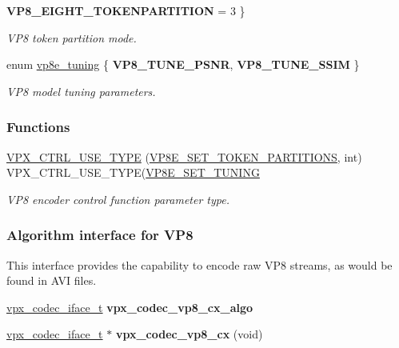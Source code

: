 \begin{DoxyCompactItemize}
{\bfseries V\-P8\-\_\-\-E\-I\-G\-H\-T\-\_\-\-T\-O\-K\-E\-N\-P\-A\-R\-T\-I\-T\-I\-O\-N} = 3
 \}
\begin{DoxyCompactList}\small\item\em V\-P8 token partition mode. \end{DoxyCompactList}\item 
enum \hyperlink{group__vp8__encoder_ga371dbc29054b3d46364af996ad42ab94}{vp8e\-\_\-tuning} \{ {\bfseries V\-P8\-\_\-\-T\-U\-N\-E\-\_\-\-P\-S\-N\-R}, 
{\bfseries V\-P8\-\_\-\-T\-U\-N\-E\-\_\-\-S\-S\-I\-M}
 \}
\begin{DoxyCompactList}\small\item\em V\-P8 model tuning parameters. \end{DoxyCompactList}\end{DoxyCompactItemize}
\subsubsection*{Functions}
\begin{DoxyCompactItemize}
\item 
\hyperlink{group__vp8__encoder_gafdd19c923e5a9457928d924823d1c5f4}{V\-P\-X\-\_\-\-C\-T\-R\-L\-\_\-\-U\-S\-E\-\_\-\-T\-Y\-P\-E} (\hyperlink{group__vp8__encoder_gga6deae3d561c838952552c3d3756322eca462a4f14f39a6eb5c4a4004fc8d0ad75}{V\-P8\-E\-\_\-\-S\-E\-T\-\_\-\-T\-O\-K\-E\-N\-\_\-\-P\-A\-R\-T\-I\-T\-I\-O\-N\-S}, int) V\-P\-X\-\_\-\-C\-T\-R\-L\-\_\-\-U\-S\-E\-\_\-\-T\-Y\-P\-E(\hyperlink{group__vp8__encoder_gga6deae3d561c838952552c3d3756322eca126ccbe7bde63b59cec5ea68a82dd498}{V\-P8\-E\-\_\-\-S\-E\-T\-\_\-\-T\-U\-N\-I\-N\-G}
\begin{DoxyCompactList}\small\item\em V\-P8 encoder control function parameter type. \end{DoxyCompactList}\end{DoxyCompactItemize}
\subsubsection*{Algorithm interface for V\-P8}
\label{_amgrp0b829b38ff2e659173b35cd78e0735bd}%
 This interface provides the capability to encode raw V\-P8 streams, as would be found in A\-V\-I files. \begin{DoxyCompactItemize}
\item 
\hypertarget{group__vp8__encoder_ga689ede372ab835c8e1c9631f17b47eb5}{\hyperlink{group__codec_gad654f3da60151f5dfef70aca00ef1e9e}{vpx\-\_\-codec\-\_\-iface\-\_\-t} {\bfseries vpx\-\_\-codec\-\_\-vp8\-\_\-cx\-\_\-algo}}\label{group__vp8__encoder_ga689ede372ab835c8e1c9631f17b47eb5}

\item 
\hypertarget{group__vp8__encoder_ga1b5362d0d5b5a2d50f173f9c160fad9f}{\hyperlink{group__codec_gad654f3da60151f5dfef70aca00ef1e9e}{vpx\-\_\-codec\-\_\-iface\-\_\-t} $\ast$ {\bfseries vpx\-\_\-codec\-\_\-vp8\-\_\-cx} (void)}\label{group__vp8__encoder_ga1b5362d0d5b5a2d50f173f9c160fad9f}

\end{DoxyCompactItemize}


